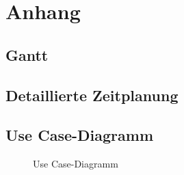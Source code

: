 \section{Anhang}
\subsection{Gantt}
\label{app:Gantt}

\subsection{Detaillierte Zeitplanung}
\label{app:Zeitplanung}



\subsection{Use Case-Diagramm}
\label{app:UseCase}
\begin{figure}[htb]
\centering
% 
\caption{Use Case-Diagramm}
\end{figure}


